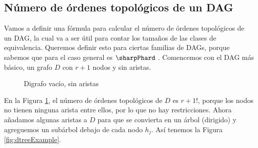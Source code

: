 \subsection{Número de órdenes topológicos de un DAG}\label{sect:Number Of Toposorts}

Vamos a definir una fórmula para calcular el número de órdenes topológicos de un DAG, la cual va a ser útil para contar los tamaños de las clases de equivalencia. Queremos definir esto para ciertas familias de DAGs, porque sabemos que para el caso general es $\sharpPhard$ \cite{countingLinearExtensions}. Comencemos con el DAG más básico, un grafo $D$ con $r+1$ nodos y sin aristas.


\begin{figure}[ht]
\centering 
    \caption{Digrafo vacío, sin aristas}
    \label{fig:emptyGraphExample}
\end{figure}

En la Figura \ref{fig:emptyGraphExample}, el número de órdenes topológicos de $D$ es $r+1!$, porque los nodos no tienen ninguna arista entre ellos, por lo que no hay restricciones. Ahora añadamos algunas aristas a $D$ para que se convierta en un árbol (dirigido) y agreguemos un subárbol debajo de cada nodo $h_j$. Así tenemos la Figura \ref{fig:dtreeExample}.


